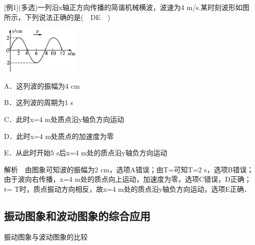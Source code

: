 {[}例1{]}(多选)一列沿x轴正方向传播的简谐机械横波，波速为4
m/s.某时刻波形如图所示，下列说法正确的是(　DE　)

\begin{center}\includegraphics[width=1.49028in,height=0.89653in]{media/image531.png}\end{center}
A．这列波的振幅为4 cm

B．这列波的周期为1 s

C．此时x=4 m处质点沿y轴负方向运动

D．此时x=4 m处质点的加速度为零

E．从此时开始5 s后x=4 m处的质点沿y轴负方向运动

解析　由图象可知波的振幅为2 cm，选项A错误；由T=可知T=2
s，选项B错误；由于波向右传播，x=4
m处的质点向上运动，加速度为零，选项C错误，D正确；t=
T时，质点振动方向相反，故x=4 m处的质点沿y轴负方向运动，选项E正确．

\subsection{振动图象和波动图象的综合应用}

振动图象与波动图象的比较

